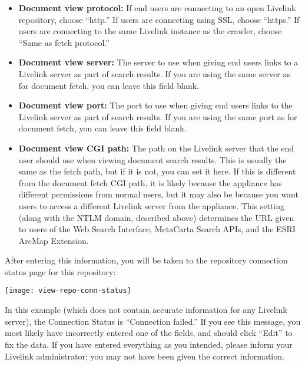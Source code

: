 \begin{itemize}

\item \textbf{Document view protocol:} If end users are connecting to an open
Livelink repository, choose ``http.'' If users are connecting using SSL,
choose ``https.'' If users are connecting to the same Livelink instance
as the crawler, choose ``Same as fetch protocol.''

\item \textbf{Document view server:} The server to use when giving end
users links to a Livelink server as part of search results. If you
are using the same server as for document fetch, you can leave this
field blank.

\item \textbf{Document view port:} The port to use when giving end users
links to the Livelink server as part of search results. If you are using
the same port as for document fetch, you can leave this field blank.

\item \textbf{Document view CGI path:} The path on the Livelink server
that the end user should use when viewing document search results. This
is usually the same as the fetch path, but if it is not, you can set
it here. If this is different from the document fetch CGI path, it is
likely because the appliance has different permissions from normal users,
but it may also be because you want users to access a different Livelink
server from the appliance. This setting (along with the NTLM domain,
described above) determines the URL given to users of the Web Search
Interface, MetaCarta Search APIs, and the ESRI ArcMap Extension.

\end{itemize}


After entering this information, you will be taken to the repository 
connection status page for this repository:

\texttt{[image: view-repo-conn-status]}

In this example (which does not contain accurate information for any
Livelink server), the Connection Status is ``Connection failed.''
If you see this message, you most likely have incorrectly entered one
of the fields, and should click ``Edit'' to fix the data. If you have
entered everything as you intended, please inform your Livelink administrator;
you may not have been given the correct information.
